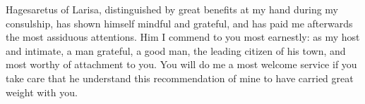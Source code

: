 

Hagesaretus of Larisa, distinguished by great benefits at my hand during my consulship, has shown himself mindful and grateful, and has paid me afterwards the most assiduous attentions. Him I commend to you most earnestly: as my host and intimate, a man grateful, a good man, the leading citizen of his town, and most worthy of attachment to you. You will do me a most welcome service if you take care that he understand this recommendation of mine to have carried great weight with you.
